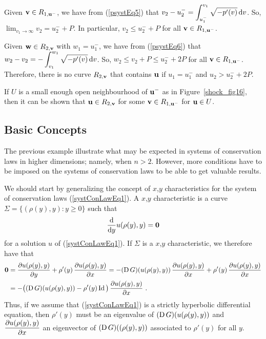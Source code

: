 \begin{egg}
Given $\VEC{v} \in R_{1,\VEC{u}^-}$, we have from (\ref{psystEq5}) that
$\displaystyle v_2 - u_2^- = \int_{u_1^-}^{v_1} \sqrt{-p'(v)} \dx{v}$.
So, $\displaystyle \lim_{v_1 \to \infty} v_2 = u_2^- + P$.  In
particular, $\displaystyle v_2 \leq u_2^- + P$ for all
$\VEC{v} \in R_{1,\VEC{u}^-}$.

Given $\VEC{w} \in R_{2,\VEC{v}}$ with $\displaystyle w_1 = u_1^-$, we have from
(\ref{psystEq6}) that
$\displaystyle w_2 - v_2 = -\int_{v_1}^{w_1} \sqrt{-p'(v)} \dx{v}$.
So, $\displaystyle w_2 \leq v_2 + P \leq u_2^- + 2P$ for all
$\VEC{v} \in R_{1,\VEC{u}^-}$.
Therefore, there is no curve $R_{2,\VEC{v}}$ that contains $\VEC{u}$ if
$\displaystyle u_1 = u_1^-$ and $\displaystyle u_2 > u_2^- + 2 P$.


If $U$ is a small enough open neighbourhood of $\displaystyle \VEC{u}^-$ as in
Figure~\ref{shock_fig16}, then it can be shown that
$\VEC{u} \in R_{2,\VEC{v}}$ for some $\VEC{v} \in R_{1,\VEC{u}^-}$
for $\VEC{u} \in U$.
\end{egg}

\subsection{Basic Concepts}

The previous example illustrate what may be expected in systems of
conservation laws in higher dimensions; namely, when $n>2$.  However,
more conditions have to be imposed on the systems of conservation laws
to be able to get valuable results.

We should start by generalizing the concept of $x$,$y$ characteristics
for the system of conservation laws (\ref{systConLawEq1}).
A $x$,$y$ characteristic is a curve
$\Sigma = \{ (\rho(y),y) : y \geq 0 \}$ such that
\[
  \dfdx{u(\rho(y),y)}{y} = \VEC{0}
\]
for a solution $u$ of (\ref{systConLawEq1}).  If $\Sigma$ is a $x$,$y$
characteristic, we therefore have that
\begin{align*}
\VEC{0} &= \pdydx{u(\rho(y),y)}{y} + \rho'(y)\, \pdydx{u(\rho(y),y)}{x} 
= -(\diff G)(u(\rho(y),y))\, \pdydx{u(\rho(y),y)}{x}
+ \rho'(y)\, \pdydx{u(\rho(y),y)}{x} \\
&= -\big( (\diff G)(u(\rho(y),y)) - \rho'(y) \Id \big)\,
\pdydx{u(\rho(y),y)}{x} \ .
\end{align*}
Thus, if we assume that (\ref{systConLawEq1}) is a strictly hyperbolic
differential equation, then $\rho'(y)$ must be an eigenvalue of
$(\diff G)(u(\rho(y),y))$ and $\displaystyle \pdydx{u(\rho(y),y)}{x}$
an eigenvector of $(\diff G)((\rho(y),y))$ associated to $\rho'(y)$
for all $y$.


